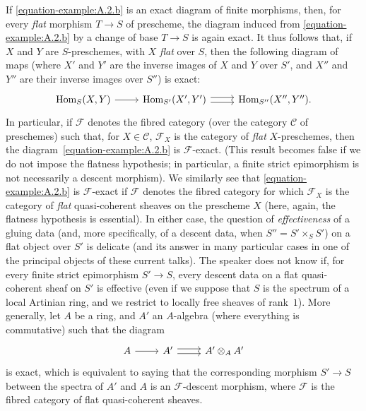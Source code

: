 \documentclass{article}
\theoremstyle{plain}
\theoremstyle{definition}
\newcommand{\sh}[1]{{\mathscr{#1}}}
\newcommand{\cat}[1]{{\mathcal{#1}}}
\DeclareMathOperator{\Hom}{Hom}
\newcommand{\oldpage}[1]{\marginpar{\footnotesize$\Big\vert$ \textit{p.~#1}}}
\begin{document}
\subsubsection{}
\label{A.2.c}

If \cref{equation-example:A.2.b} is an exact diagram of finite morphisms, then, for every \emph{flat} morphism $T\to S$ of prescheme, the diagram induced from \cref{equation-example:A.2.b} by a change of base $T\to S$ is again exact.
It thus follows that, if $X$ and $Y$ are $S$-preschemes, with $X$ \emph{flat} over $S$, then the following diagram of maps (where $X'$ and $Y'$ are the inverse images of $X$ and $Y$ over $S'$, and $X''$ and $Y''$ are their inverse images over $S''$) is exact:
\[
  \begin{tikzcd}
    \Hom_S(X,Y) \rar
    & \Hom_{S'}(X',Y') \rar[shift left=1] \rar[shift right=1]
    & \Hom_{S''}(X'',Y'').
  \end{tikzcd}
\]
In particular, if $\sh{F}$ denotes the fibred category (over the category $\cat{C}$ of preschemes) such that, for $X\in\cat{C}$, $\sh{F}_X$ is the category of \emph{flat} $X$-preschemes, then the diagram~\cref{equation-example:A.2.b} is $\sh{F}$-exact.
(This result becomes false if we do not impose the flatness hypothesis; in particular, a finite strict epimorphism is not necessarily a descent morphism).
We similarly see that \cref{equation-example:A.2.b} is $\sh{F}$-exact if $\sh{F}$ denotes the fibred category for which $\sh{F}_X$ is the category of \emph{flat} quasi-coherent sheaves on the prescheme $X$ (here, again, the
\oldpage{190-09}
flatness hypothesis is essential).
In either case, the question of \emph{effectiveness} of a gluing data (and, more specifically, of a descent data, when $S''=S'\times_S S'$) on a flat object over $S'$ is delicate (and its answer in many particular cases in one of the principal objects of these current talks).
The speaker does not know if, for every finite strict epimorphism $S'\to S$, every descent data on a flat quasi-coherent sheaf on $S'$ is effective (even if we suppose that $S$ is the spectrum of a local Artinian ring, and we restrict to locally free sheaves of rank~$1$).
More generally, let $A$ be a ring, and $A'$ an $A$-algebra (where everything is commutative) such that the diagram
\[
  \begin{tikzcd}
    A \rar
    & A' \rar[shift left=1] \rar[shift right=1]
    & A'\otimes_A A'
  \end{tikzcd}
\]
is exact, which is equivalent to saying that the corresponding morphism $S'\to S$ between the spectra of $A'$ and $A$ is an $\sh{F}$-descent morphism, where $\sh{F}$ is the fibred category of flat quasi-coherent sheaves.
\end{document}
